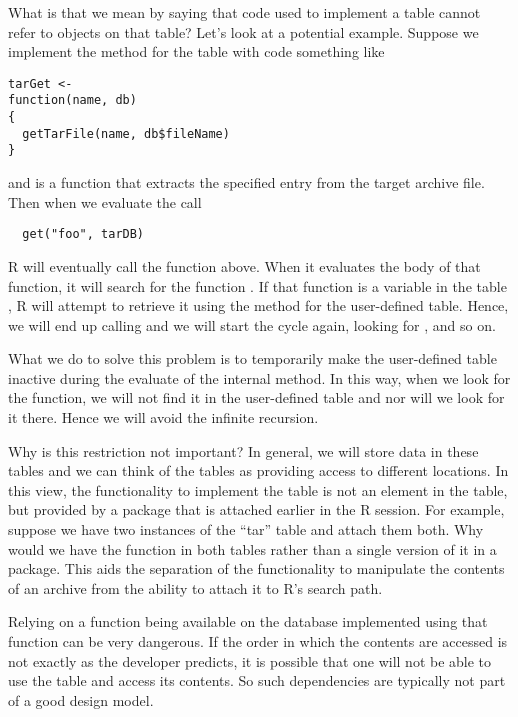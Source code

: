 \documentclass{article}
\begin{document}
What is that we mean by saying that code used to implement a table
cannot refer to objects on that table?  Let's look at a potential
example.  Suppose we implement the  method for the
table with code something like
\begin{verbatim}
tarGet <-
function(name, db)
{
  getTarFile(name, db$fileName)
}
\end{verbatim}%
and  is a function
that extracts the specified entry from the target archive file.
Then when we evaluate the call
\begin{verbatim}
  get("foo", tarDB)
\end{verbatim}
R will eventually call the  function above.  When it
evaluates the body of that function, it will search for the function
.  If that function is a variable in the table
, R will attempt to retrieve it using the
 method for the user-defined table. Hence, we will end
up calling  and we will start the cycle again,
looking for , and so on.

What we do to solve this problem is to temporarily make the
user-defined table inactive during the evaluate of the internal
 method. In this way, when we look for the
 function, we will not find it in the
user-defined table and nor will we look for it there.
Hence we will avoid the infinite recursion.

Why is this restriction not important?  In general, we will store data
in these tables and we can think of the tables as providing access to
different locations. In this view, the functionality to implement the
table is not an element in the table, but provided by a package that
is attached earlier in the R session.  For example, suppose we have
two instances of the ``tar'' table and attach them both. Why would we
have the function  in both tables rather than a
single version of it in a package.  This aids the separation of the
functionality to manipulate the contents of an archive from the
ability to attach it to R's search path.

Relying on a function being available on the database implemented
using that function can be very dangerous. If the order in which the
contents are accessed is not exactly as the developer predicts, it is
possible that one will not be able to use the table and access its
contents.  So such dependencies are typically not part of a good design model.
\end{document}
